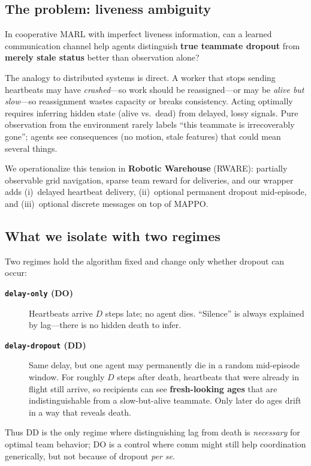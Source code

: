 \documentclass[conference,onecolumn]{IEEEtran}
\begin{document}
\subsection{The problem: liveness ambiguity}

In cooperative MARL with imperfect liveness information, can a learned communication channel help agents distinguish \textbf{true teammate dropout} from \textbf{merely stale status} better than observation alone?

The analogy to distributed systems is direct. A worker that stops sending heartbeats may have \emph{crashed}---so work should be reassigned---or may be \emph{alive but slow}---so reassignment wastes capacity or breaks consistency. Acting optimally requires inferring hidden state (alive vs.\ dead) from delayed, lossy signals. Pure observation from the environment rarely labels ``this teammate is irrecoverably gone''; agents see consequences (no motion, stale features) that could mean several things.

We operationalize this tension in \textbf{Robotic Warehouse} (RWARE): partially observable grid navigation, sparse team reward for deliveries, and our wrapper adds (i)~delayed heartbeat delivery, (ii)~optional permanent dropout mid-episode, and (iii)~optional discrete messages on top of MAPPO.

\subsection{What we isolate with two regimes}

Two regimes hold the algorithm fixed and change only whether dropout can occur:

\begin{description}
  \item[\textbf{\texttt{delay-only} (DO)}] Heartbeats arrive $D$ steps late; no agent dies. ``Silence'' is always explained by lag---there is no hidden death to infer.
  \item[\textbf{\texttt{delay-dropout} (DD)}] Same delay, but one agent may permanently die in a random mid-episode window. For roughly $D$ steps after death, heartbeats that were already in flight still arrive, so recipients can see \textbf{fresh-looking ages} that are indistinguishable from a slow-but-alive teammate. Only later do ages drift in a way that reveals death.
\end{description}

Thus DD is the only regime where distinguishing lag from death is \emph{necessary} for optimal team behavior; DO is a control where comm might still help coordination generically, but not because of dropout \emph{per se}.
\end{document}
